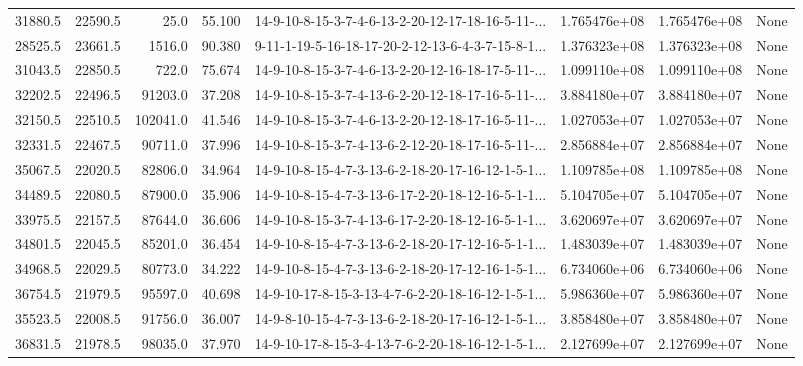 \begin{tabular}{rrrrlrrl}
 31880.5 &  22590.5 &           25.0 &             55.100 &  14-9-10-8-15-3-7-4-6-13-2-20-12-17-18-16-5-11-... &  1.765476e+08 &  1.765476e+08 &   None \\
 28525.5 &  23661.5 &         1516.0 &             90.380 &  9-11-1-19-5-16-18-17-20-2-12-13-6-4-3-7-15-8-1... &  1.376323e+08 &  1.376323e+08 &   None \\
 31043.5 &  22850.5 &          722.0 &             75.674 &  14-9-10-8-15-3-7-4-6-13-2-20-12-16-18-17-5-11-... &  1.099110e+08 &  1.099110e+08 &   None \\
 32202.5 &  22496.5 &        91203.0 &             37.208 &  14-9-10-8-15-3-7-4-13-6-2-20-12-18-17-16-5-11-... &  3.884180e+07 &  3.884180e+07 &   None \\
 32150.5 &  22510.5 &       102041.0 &             41.546 &  14-9-10-8-15-3-7-4-6-13-2-20-12-18-17-16-5-11-... &  1.027053e+07 &  1.027053e+07 &   None \\
 32331.5 &  22467.5 &        90711.0 &             37.996 &  14-9-10-8-15-3-7-4-13-6-2-12-20-18-17-16-5-11-... &  2.856884e+07 &  2.856884e+07 &   None \\
 35067.5 &  22020.5 &        82806.0 &             34.964 &  14-9-10-8-15-4-7-3-13-6-2-18-20-17-16-12-1-5-1... &  1.109785e+08 &  1.109785e+08 &   None \\
 34489.5 &  22080.5 &        87900.0 &             35.906 &  14-9-10-8-15-4-7-3-13-6-17-2-20-18-12-16-5-1-1... &  5.104705e+07 &  5.104705e+07 &   None \\
 33975.5 &  22157.5 &        87644.0 &             36.606 &  14-9-10-8-15-3-7-4-13-6-17-2-20-18-12-16-5-1-1... &  3.620697e+07 &  3.620697e+07 &   None \\
 34801.5 &  22045.5 &        85201.0 &             36.454 &  14-9-10-8-15-4-7-3-13-6-2-18-20-17-12-16-5-1-1... &  1.483039e+07 &  1.483039e+07 &   None \\
 34968.5 &  22029.5 &        80773.0 &             34.222 &  14-9-10-8-15-4-7-3-13-6-2-18-20-17-12-16-1-5-1... &  6.734060e+06 &  6.734060e+06 &   None \\
 36754.5 &  21979.5 &        95597.0 &             40.698 &  14-9-10-17-8-15-3-13-4-7-6-2-20-18-16-12-1-5-1... &  5.986360e+07 &  5.986360e+07 &   None \\
 35523.5 &  22008.5 &        91756.0 &             36.007 &  14-9-8-10-15-4-7-3-13-6-2-18-20-17-16-12-1-5-1... &  3.858480e+07 &  3.858480e+07 &   None \\
 36831.5 &  21978.5 &        98035.0 &             37.970 &  14-9-10-17-8-15-3-4-13-7-6-2-20-18-16-12-1-5-1... &  2.127699e+07 &  2.127699e+07 &   None \\
\bottomrule
\end{tabular}
